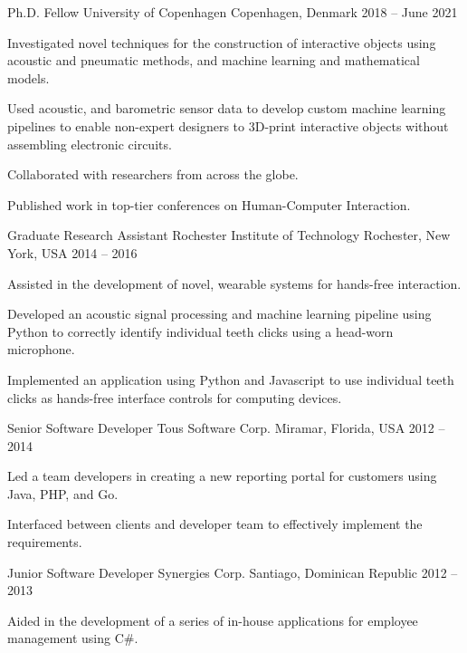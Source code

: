 

\begin{cventries}
  \cventry
    {Ph.D. Fellow}
    {University of Copenhagen}
    {Copenhagen, Denmark}
    {2018 -- June 2021}
    {
      \begin{cvitems}
        \item Investigated novel techniques for the construction of
          interactive objects using acoustic and pneumatic methods, and machine
          learning and mathematical models.
        \item Used acoustic, and barometric sensor data to develop custom
          machine learning pipelines to enable non-expert designers to 3D-print
          interactive objects without assembling electronic circuits.
        \item Collaborated with researchers from across the globe.
        \item Published work in top-tier conferences on Human-Computer
          Interaction.
      \end{cvitems}
      \vspace{1em}
    }

  \cventry
    {Graduate Research Assistant}
    {Rochester Institute of Technology}
    {Rochester, New York, USA}
    {2014 -- 2016}
    {
      \begin{cvitems}
        \item Assisted in the development of novel, wearable systems for
          hands-free interaction.
        \item Developed an acoustic signal processing and machine learning
          pipeline using Python to correctly identify individual teeth clicks
          using a head-worn microphone.
        \item Implemented an application using Python and Javascript to use
          individual teeth clicks as hands-free interface controls for
          computing devices.
      \end{cvitems}
    }

  \cventry
    {Senior Software Developer}
    {Tous Software Corp.}
    {Miramar, Florida, USA}
    {2012 -- 2014}
    {
      \begin{cvitems}
        \item Led a team developers in creating a new reporting portal for
          customers using Java, PHP, and Go.
        \item Interfaced between clients and developer team to effectively
          implement the requirements.
      \end{cvitems}
    }

  \cventry
    {Junior Software Developer}
    {Synergies Corp.}
    {Santiago, Dominican Republic}
    {2012 -- 2013}
    {
      \begin{cvitems}
        \item Aided in the development of a series of in-house applications
        for employee management using C\#.
      \end{cvitems}
    }
	
\end{cventries}
